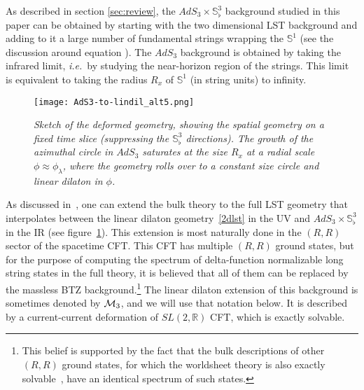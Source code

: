 \documentclass[12pt]{article}
\def\ie{{i.e.}}
\def\MM{{\mathcal{M}}}
\newcommand{\bR}{{\mathbb R}}
\newcommand{\bS}{{\mathbb S}}
\numberwithin{equation}{section}
\def\ie{{\it i.e.}}
\def\MM{{\cal M}}
\def\ie{{\it i.e.}}
\begin{document}


\label{sec:deflin}



As described in section \ref{sec:review}, the $AdS_3\times \bS^3_\flat$ background studied in this paper can be obtained by starting with the two dimensional LST background 
%
\eqn[2dlst]{\bR_t\times \bS^1\times\bR_\phi\times \bS^3_\flat~,} 
%
and adding to it a large number of fundamental strings wrapping the $\bS^1$ (see the discussion around equation \twodlst). The $AdS_3$ background is obtained by taking the infrared limit, \ie\ by studying the near-horizon region of the strings.  This limit is equivalent to taking the radius $R_x$ of $\bS^1$ (in string units) to infinity.

\begin{figure}[ht]
%
\centering
\texttt{[image: AdS3-to-lindil\_alt5.png]}
\caption{\it Sketch of the deformed geometry, showing the spatial geometry on a fixed time slice (suppressing the $\bS^3_\flat$ directions).  The growth of the azimuthal circle in $AdS_3$ saturates at the size $R_x$ at a radial scale $\phi\approx\phi_\lambda$, where the geometry rolls over to a constant size circle and linear dilaton in $\phi$.}
\label{fig:TTbargeom}
\end{figure}
\vspace{1mm}

As discussed in~, one can extend the bulk theory to the full LST geometry that interpolates between the linear dilaton geometry~\eqref{2dlst} in the UV and $AdS_3\times\bS^3_\flat$ in the IR (see figure~\ref{fig:TTbargeom}). This extension is most naturally done in the $(\!R,\!R)$ sector of the spacetime CFT. This CFT has multiple $(\!R,\!R)$ ground states, but for the purpose of computing the spectrum of delta-function normalizable long string states in the full theory, it is believed that all of them can be replaced by the massless BTZ background.\footnote{This belief is supported by the fact that the bulk descriptions of other $(\!R,\!R)$ ground states, for which the worldsheet theory is also exactly solvable~, have an identical spectrum of such states.} The linear dilaton extension of this background is sometimes denoted by $\MM_3$, and we will use that notation below. It is described by a current-current deformation of $SL(2,\bR)$ CFT, which is exactly solvable.
\end{document}
